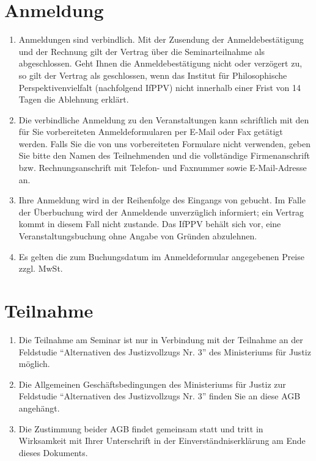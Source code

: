 \documentclass[a4paper, 12pt]{scrartcl}
\begin{document}
    \section{Anmeldung}
    \begin{enumerate}
        \item Anmeldungen sind verbindlich.
        Mit der Zusendung der Anmeldebestätigung und der Rechnung gilt der Vertrag über die Seminarteilnahme als abgeschlossen.
        Geht Ihnen die Anmeldebestätigung nicht oder verzögert zu, so gilt der Vertrag als geschlossen, wenn das Institut f\"ur Philosophische Perspektivenvielfalt (nachfolgend IfPPV) nicht innerhalb einer Frist von 14 Tagen die Ablehnung erklärt.

        \item Die verbindliche Anmeldung zu den Veranstaltungen kann schriftlich mit den für Sie vorbereiteten Anmeldeformularen per E-Mail oder Fax getätigt werden.
        Falls Sie die von uns vorbereiteten Formulare nicht verwenden, geben Sie bitte den Namen des Teilnehmenden und die vollständige Firmenanschrift bzw. Rechnungsanschrift mit Telefon- und Faxnummer sowie E-Mail-Adresse an.

        \item Ihre Anmeldung wird in der Reihenfolge des Eingangs von gebucht.
        Im Falle der Überbuchung wird der Anmeldende unverzüglich informiert; ein Vertrag kommt in diesem Fall nicht zustande.
        Das IfPPV beh\"alt sich vor, eine Veranstaltungsbuchung ohne Angabe von Gr\"unden abzulehnen.

        \item Es gelten die zum Buchungsdatum im Anmeldeformular angegebenen Preise zzgl. MwSt.
    \end{enumerate}

    \section{Teilnahme}
    \begin{enumerate}
        \item Die Teilnahme am Seminar ist nur in Verbindung mit der Teilnahme an der Feldstudie \enquote{Alternativen des Justizvollzugs Nr. 3} des Ministeriums f\"ur Justiz m\"oglich.
        
        \item Die Allgemeinen Gesch\"aftsbedingungen des Ministeriums f\"ur Justiz zur Feldstudie \enquote{Alternativen des Justizvollzugs Nr. 3} finden Sie an diese AGB angeh\"angt.
        
        \item Die Zustimmung beider AGB findet gemeinsam statt und tritt in Wirksamkeit mit Ihrer Unterschrift in der Einverst\"andniserkl\"arung am Ende dieses Dokuments.
    \end{enumerate}
\end{document}
